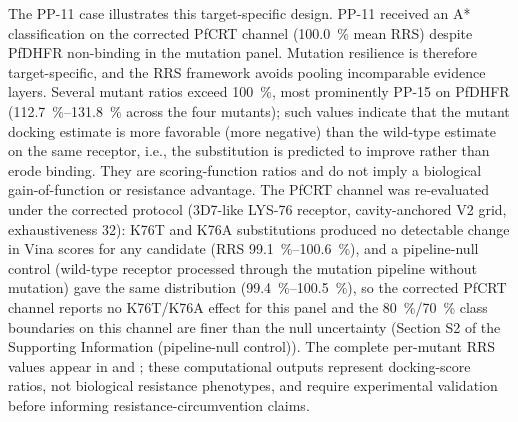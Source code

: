 \documentclass[11pt,a4paper]{article}
\begin{document}
	The PP-11 case illustrates this target-specific design. PP-11 received an A* classification on the corrected PfCRT channel (\qty{100.0}{\percent} mean RRS) despite PfDHFR non-binding in the mutation panel. Mutation resilience is therefore target-specific, and the RRS framework avoids pooling incomparable evidence layers. Several mutant ratios exceed \qty{100}{\percent}, most prominently PP-15 on PfDHFR (\qtyrange{112.7}{131.8}{\percent} across the four mutants); such values indicate that the mutant docking estimate is more favorable (more negative) than the wild-type estimate on the same receptor, i.e., the substitution is predicted to improve rather than erode binding. They are scoring-function ratios and do not imply a biological gain-of-function or resistance advantage. The PfCRT channel was re-evaluated under the corrected protocol (3D7-like LYS-76 receptor, cavity-anchored V2 grid, exhaustiveness \num{32}): K76T and K76A substitutions produced no detectable change in Vina scores for any candidate (RRS \qtyrange{99.1}{100.6}{\percent}), and a pipeline-null control (wild-type receptor processed through the mutation pipeline without mutation) gave the same distribution (\qtyrange{99.4}{100.5}{\percent}), so the corrected PfCRT channel reports no K76T/K76A effect for this panel and the \qty{80}{\percent}/\qty{70}{\percent} class boundaries on this channel are finer than the null uncertainty (Section S2 of the Supporting Information (pipeline-null control)). The complete per-mutant RRS values appear in  and ; these computational outputs represent docking-score ratios, not biological resistance phenotypes, and require experimental validation before informing resistance-circumvention claims.
	
\end{document}
